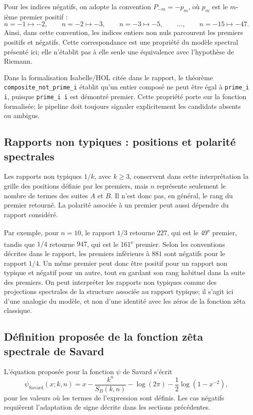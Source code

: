 \documentclass[11pt,a4paper]{article}
\begin{document}
Pour les indices négatifs, on adopte la convention $P_{-m}=-p_m$, où $p_m$
est le $m$-ième premier positif :
\[
n=-1\mapsto -2,\qquad n=-2\mapsto -3,\qquad n=-3\mapsto -5,\qquad
\ldots,\qquad n=-15\mapsto -47.
\]
Ainsi, dans cette convention, les indices entiers non nuls parcourent les
premiers positifs et négatifs. Cette correspondance est une propriété du
modèle spectral présenté ici; elle n'établit pas à elle seule une équivalence
avec l'hypothèse de Riemann.

Dans la formalisation Isabelle/HOL citée dans le rapport, le théorème
\texttt{composite\_not\_prime\_i} établit qu'un entier composé ne peut être
égal à \texttt{prime\_i i}, puisque \texttt{prime\_i i} est démontré premier.
Cette propriété porte sur la fonction formalisée; le pipeline doit toujours
signaler explicitement les candidats absents ou ambigus.

\subsection{Rapports non typiques : positions et polarité spectrales}

Les rapports non typiques $1/k$, avec $k\geq 3$, conservent dans cette
interprétation la grille des positions définie par les premiers, mais $n$
représente seulement le nombre de termes des suites $A$ et $B$. Il n'est donc
pas, en général, le rang du premier retourné. La polarité associée à un
premier peut aussi dépendre du rapport considéré.

Par exemple, pour $n=10$, le rapport $1/3$ retourne $227$, qui est le
49\textsuperscript{e} premier, tandis que $1/4$ retourne $947$, qui est le
161\textsuperscript{e} premier. Selon les conventions décrites dans le
rapport, les premiers inférieurs à $881$ sont négatifs pour le rapport $1/4$.
Un même premier peut donc être positif pour un rapport non typique et négatif
pour un autre, tout en gardant son rang habituel dans la suite des premiers.
On peut interpréter les rapports non typiques comme des projections spectrales
de la structure associée au rapport typique; il s'agit ici d'une analogie du
modèle, et non d'une identité avec les zéros de la fonction zêta classique.

\subsection{Définition proposée de la fonction zêta spectrale de Savard}

L'équation proposée pour la fonction $\psi$ de Savard s'écrit
\[
\psi_{\mathrm{Savard}}(x;k,n)
=x-\frac{k^n}{S_B(k,n)}
-\log(2\pi)-\frac{1}{2}\log(1-x^{-2}),
\]
pour les valeurs où les termes de l'expression sont définis. Les cas négatifs
requièrent l'adaptation de signe décrite dans les sections précédentes.
\end{document}
